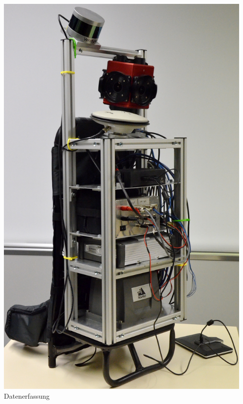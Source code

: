 \documentclass[aspectratio=169]{beamer}
\begin{document}
\begin{frame}
\begin{columns}[onlytextwidth]
\begin{column}{0.33\textwidth}
      \includegraphics[height=0.7\textheight]{./Abbildungen/cappro_2.JPG}
      \\
      Datenerfassung
    \end{column}
    \begin{column}{0.33\textwidth}

\end{column}
\end{columns}
\end{frame}
\end{document}
